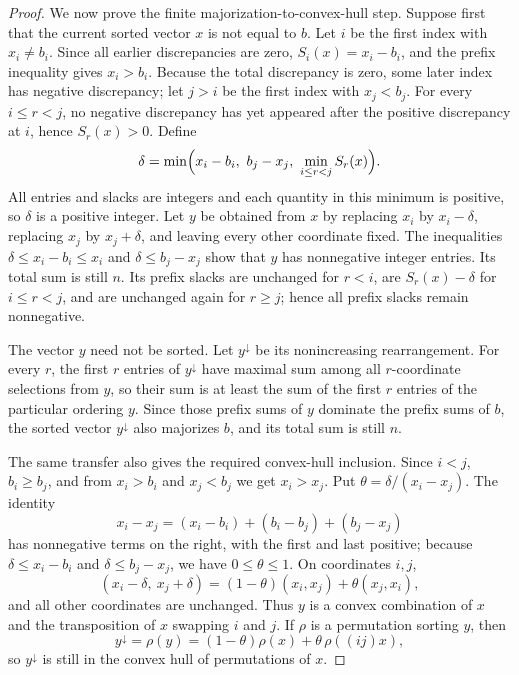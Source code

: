 \begin{proof}
We now prove the finite majorization-to-convex-hull step.  Suppose first
that the current sorted vector \(x\) is not equal to \(b\).  Let \(i\) be the
first index with \(x_i\ne b_i\).  Since all earlier discrepancies are zero,
\(S_i(x)=x_i-b_i\), and the prefix inequality gives \(x_i>b_i\).  Because
the total discrepancy is zero, some later index has negative discrepancy;
let \(j>i\) be the first index with \(x_j<b_j\).  For every
\(i\le r<j\), no negative discrepancy has yet appeared after the positive
discrepancy at \(i\), hence \(S_r(x)>0\).  Define
\[
\delta=\min\Bigl(x_i-b_i,\ b_j-x_j,\ \min_{i\le r<j}S_r(x)\Bigr).
\]
All entries and slacks are integers and each quantity in this minimum is
positive, so \(\delta\) is a positive integer.  Let \(y\) be obtained from
\(x\) by replacing \(x_i\) by \(x_i-\delta\), replacing \(x_j\) by
\(x_j+\delta\), and leaving every other coordinate fixed.  The inequalities
\(\delta\le x_i-b_i\le x_i\) and \(\delta\le b_j-x_j\) show that \(y\) has
nonnegative integer entries.  Its total sum is still \(n\).  Its prefix
slacks are unchanged for \(r<i\), are \(S_r(x)-\delta\) for
\(i\le r<j\), and are unchanged again for \(r\ge j\); hence all prefix
slacks remain nonnegative.

The vector \(y\) need not be sorted.  Let \(y^\downarrow\) be its
nonincreasing rearrangement.  For every \(r\), the first \(r\) entries of
\(y^\downarrow\) have maximal sum among all \(r\)-coordinate selections from
\(y\), so their sum is at least the sum of the first \(r\) entries of the
particular ordering \(y\).  Since those prefix sums of \(y\) dominate the
prefix sums of \(b\), the sorted vector \(y^\downarrow\) also majorizes
\(b\), and its total sum is still \(n\).

The same transfer also gives the required convex-hull inclusion.  Since
\(i<j\), \(b_i\ge b_j\), and from \(x_i>b_i\) and \(x_j<b_j\) we get
\(x_i>x_j\).  Put \(\theta=\delta/(x_i-x_j)\).  The identity
\[
x_i-x_j=(x_i-b_i)+(b_i-b_j)+(b_j-x_j)
\]
has nonnegative terms on the right, with the first and last positive; because
\(\delta\le x_i-b_i\) and \(\delta\le b_j-x_j\), we have
\(0\le\theta\le1\).  On coordinates \(i,j\),
\[
(x_i-\delta,\ x_j+\delta)
=(1-\theta)(x_i,x_j)+\theta(x_j,x_i),
\]
and all other coordinates are unchanged.  Thus \(y\) is a convex combination
of \(x\) and the transposition of \(x\) swapping \(i\) and \(j\).  If
\(\rho\) is a permutation sorting \(y\), then
\[
y^\downarrow=\rho(y)
=(1-\theta)\rho(x)+\theta\,\rho((ij)x),
\]
so \(y^\downarrow\) is still in the convex hull of permutations of \(x\).


\end{proof}
